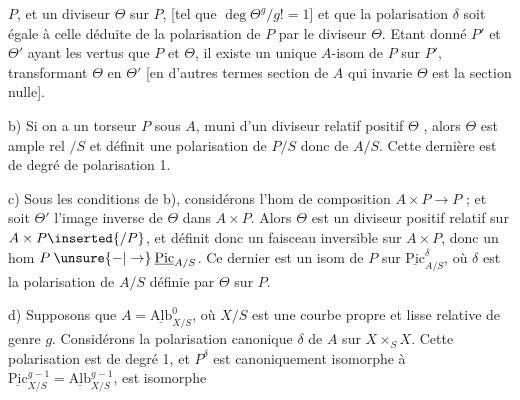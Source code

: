 
$P$, et un diviseur  $\Theta$ sur $P$, [tel que $\deg\Theta^g/g!=1$] et que la polarisation $\delta$ soit égale à celle déduite de la polarisation de $P$ par le diviseur $\Theta$. Etant donné  $P'$ et $\Theta'$ ayant les  vertus que $P$ et $\Theta$, il existe un unique $A$-isom de $P$ sur $P'$, transformant $\Theta$ en $\Theta'$ [en d'autres termes   section de $A$ qui invarie $\Theta$ est la section nulle].

b) Si on a un torseur $P$ sous $A$, muni d'un diviseur relatif positif $\Theta$ , alors $\Theta$ est ample rel $/S$ et définit  une polarisation de $P/S$ donc  de $A/S$. Cette dernière est de degré de polarisation 1.

c) Sous les conditions de b), considérons l'hom de composition $A\times P\longrightarrow P$ ; et soit $\Theta'$ l'image inverse de $\Theta$ dans $A\times P$. Alors $\Theta$ est un diviseur positif relatif sur $A\times P\inserted{/P}$, et définit donc un  faisceau inversible sur $A\times P$, donc un hom $P\mathbin{\unsure{-|\to}}\underline{\mathrm{Pic}}_{A/S}$. Ce dernier est un isom de $P$ sur $\underline{\mathrm{Pic}}^\delta_{A/S}$, où $\delta$ est la polarisation de $A/S$ définie par \deleted{$\unsure{\delta}$} $\Theta$ sur $P$.

d) Supposons que $A=\underline{\mathrm{Alb}}^0_{X/S}$, où $X/S$ est une courbe propre et lisse relative de genre $g$.  Considérons la polarisation canonique $\delta$ de $A$  sur $X\times_S X$. Cette polarisation est de degré 1, et $P^\delta$ est canoniquement isomorphe à  $\underline{\mathrm{Pic}}^{g-1}_{X/S}=\underline{\mathrm{Alb}}^{g-1}_{X/S}$, est isomorphe 

